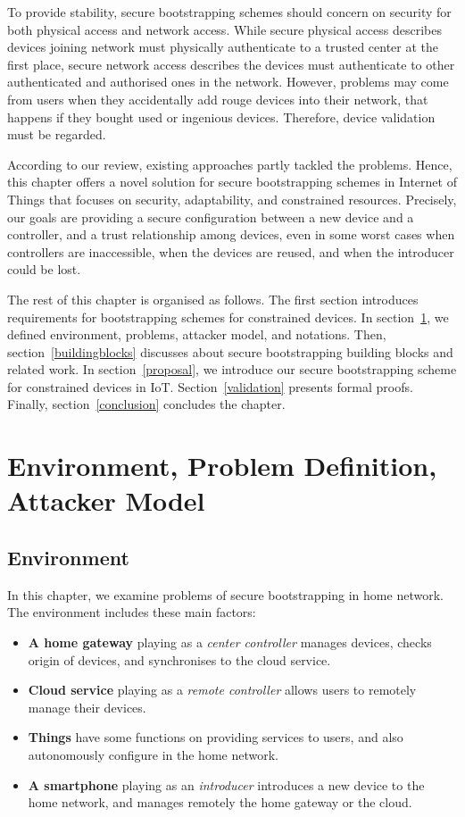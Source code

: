 To provide stability, secure bootstrapping schemes should concern on security for both physical access and network access. While secure physical access describes devices joining network must physically authenticate to a trusted center at the first place, secure network access describes the devices must authenticate to other authenticated and authorised ones in the network.  
However, problems may come from users when they accidentally add rouge devices into their network, that happens if they bought used or ingenious devices. Therefore, device validation must be regarded. 

According to our review, existing approaches partly tackled the problems. Hence, this chapter offers a novel solution for secure bootstrapping schemes in Internet of Things that focuses on security, adaptability, and constrained resources. Precisely, our goals are providing a secure configuration between a new device and a controller, and a trust relationship among devices, even in some worst cases when controllers are inaccessible, when the devices are reused, and when the introducer could be lost. 

The rest of this chapter is organised as follows. The first section introduces requirements for bootstrapping schemes for constrained devices.  In section~\ref{envi}, we defined environment, problems, attacker model, and notations. Then, section~\ref{buildingblocks} discusses about secure bootstrapping building blocks and related work. In section~\ref{proposal}, we introduce our secure bootstrapping scheme for constrained devices in IoT. Section~\ref{validation} presents formal proofs. Finally, section~\ref{conclusion} concludes the chapter. 

\section{Environment, Problem Definition, Attacker Model}\label{envi}

\subsection{Environment}

In this chapter, we examine problems of secure bootstrapping in home network. The environment includes these main factors:
\begin{itemize}
\item \textbf{A home gateway} playing as a \emph{center controller} manages devices, checks origin of devices, and synchronises to the cloud service.
\item \textbf{Cloud service} playing as a \emph{remote controller} allows users to remotely manage their devices. 
\item \textbf{Things} have some functions on providing services to users, and also autonomously configure in the home network.
\item \textbf{A smartphone} playing as an \emph{introducer} introduces a new device to the home network, and manages remotely the home gateway or the cloud.
\end{itemize}

